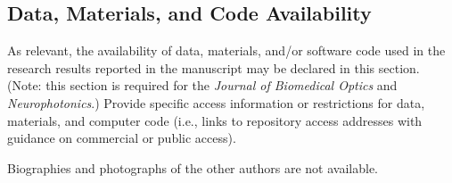 \documentclass[12pt]{spieman}  %
\begin{document}
\begin{spacing}{2}




\subsection* {Data, Materials, and Code Availability}
As relevant, the availability of data, materials, and/or software code used in the research results reported in the manuscript may be declared in this section. (Note: this section is required for the \textit{Journal of Biomedical Optics} and \textit{Neurophotonics}.) Provide specific access information or restrictions for data, materials, and computer code (i.e., links to repository access addresses with guidance on commercial or public access).






\vspace{1ex}
\noindent Biographies and photographs of the other authors are not available.

\listoffigures
\listoftables

\end{spacing}
\end{document}
